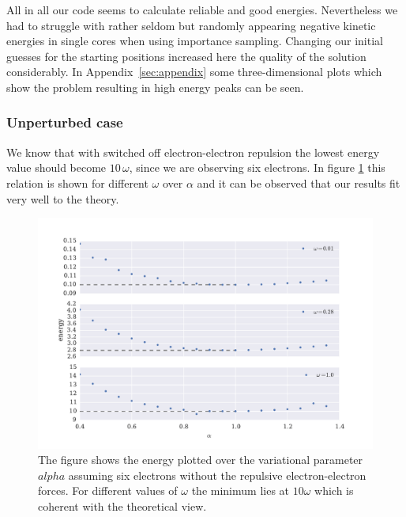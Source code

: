 All in all our code seems to calculate reliable and good energies. Nevertheless we had to struggle with rather seldom but randomly appearing negative kinetic energies in single cores when using importance sampling. Changing our initial guesses for the starting positions increased here the quality of the solution considerably. In Appendix~\ref{sec:appendix} some three-dimensional plots which show the problem resulting in high energy peaks can be seen. 

\subsubsection{Unperturbed case}
We know that with switched off electron-electron repulsion the lowest energy value should become $10\,\omega$, since we are observing six electrons. In figure \ref{fig:six_electron_unperturbed} this relation is shown for different $\omega$ over $\alpha$ and it can be observed that our results fit very well to the theory. 
\begin{figure}[htbp]
    \centering
    \includegraphics[scale=0.65]{six_electron_unperturbed}
    \caption{The figure shows the energy plotted over the variational parameter $alpha$ assuming six electrons without the repulsive electron-electron forces. For different values of $\omega$ the minimum lies at $10\omega$ which is coherent with the theoretical view.}
    \label{fig:six_electron_unperturbed}
\end{figure}

